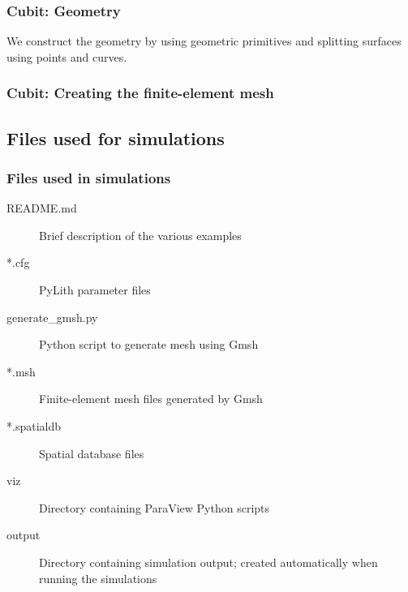 \documentclass[aspectratio=169]{beamer}
\begin{document}
\begin{frame}
  \frametitle{Cubit: Geometry}

  We construct the geometry by using geometric primitives and splitting surfaces using points and curves.
  
  
\end{frame}


\begin{frame}
  \frametitle{Cubit: Creating the finite-element mesh}

  
\end{frame}


\subsection{Files used for simulations}

\begin{frame}
  \frametitle{Files used in simulations}

  \begin{description}
  \item[README.md] Brief description of the various examples
  \item[*.cfg] PyLith parameter files
  \item[generate\_gmsh.py] Python script to generate mesh using Gmsh
  \item[*.msh] Finite-element mesh files generated by Gmsh
  \item[*.spatialdb] Spatial database files
  \item[viz] Directory containing ParaView Python scripts
  \item[output] Directory containing simulation output; created automatically when running the simulations
  \end{description}

\end{frame}
\end{document}
